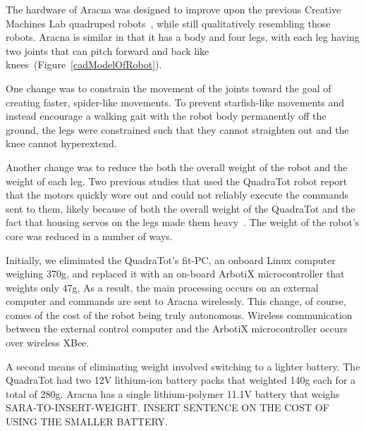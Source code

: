\documentclass[letterpaper]{article}
\begin{document}

The hardware of Aracna was designed to improve upon the previous Creative Machines Lab
quadruped robots~\citep{bongard2006resilient, yosinski2011gaits}, while still qualitatively resembling those robots. Aracna is similar in that it has a body and four legs, with each leg having two joints that can pitch forward and back like knees~(Figure~\ref{cadModelOfRobot}). 

One change was to constrain the movement of the
joints toward the goal of creating faster, spider-like movements. To
prevent starfish-like movements and instead encourage a walking gait with the robot body permanently off the ground, the legs were constrained such that they cannot straighten out and the knee cannot hyperextend. 

Another change was to reduce the both the overall weight of the robot and the weight of each leg. Two previous studies that used the QuadraTot robot report that the motors quickly wore out and could not reliably execute the commands sent to them, likely because of both the overall weight of the QuadraTot and the fact that housing servos on the legs made them heavy~\citep{bongard2006resilient, yosinski2011gaits}. The weight of the robot's core was reduced in a number of ways. 

Initially, we eliminated the QuadraTot's fit-PC, an onboard Linux computer weighing 370g, and replaced it with an on-board ArbotiX microcontroller that weights only 47g. As a result, the main processing occurs on an external computer and commands are sent to Aracna wirelessly. This change, of course, comes of the cost of the robot being truly autonomous. Wireless communication between the external control computer
and the ArbotiX  microcontroller occurs over wireless XBee.

A second means of eliminating weight involved switching to a lighter battery. The QuadraTot had two 12V lithium-ion battery packs that weighted 140g each for a total of 280g. Aracna has a single lithium-polymer 11.1V battery that weighs SARA-TO-INSERT-WEIGHT. INSERT SENTENCE ON THE COST OF USING THE SMALLER BATTERY.   
\end{document}
